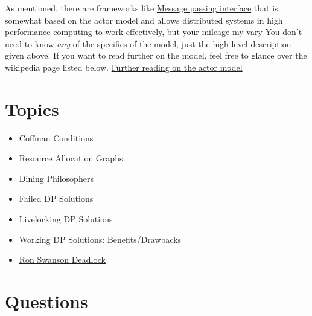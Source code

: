 As mentioned, there are frameworks like \href{https://en.wikipedia.org/wiki/Message\_Passing\_Interface}{Message passing interface} that is somewhat based on the actor model and allows distributed systems in high performance computing to work effectively, but your mileage my vary
You don't need to know \textit{any} of the specifics of the model, just the high level description given above.
If you want to read further on the model, feel free to glance over the wikipedia page listed below.
\href{https://en.wikipedia.org/wiki/Actor\_model}{Further reading on the actor model}

\section{Topics}

\begin{itemize}
  \item Coffman Conditions
  \item Resource Allocation Graphs
  \item Dining Philosophers
  \item Failed DP Solutions 
  \item Livelocking DP Solutions 
  \item Working DP Solutions: Benefits/Drawbacks
  \item \href{http://adit.io/posts/2013-05-11-The-Dining-Philosophers-Problem-With-Ron-Swanson.html}{Ron Swanson Deadlock}
\end{itemize}

\section{Questions}

